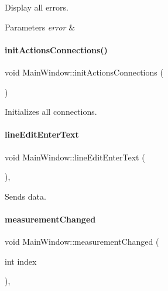 Display all errors. 


\begin{DoxyParams}{Parameters}
{\em error} & \\
\hline
\end{DoxyParams}
\mbox{\label{classMainWindow_a5235529d74723de1e3686da400dd1d37}} 
\paragraph{\texorpdfstring{init\+Actions\+Connections()}{initActionsConnections()}}
{\footnotesize\ttfamily void Main\+Window\+::init\+Actions\+Connections (\begin{DoxyParamCaption}{ }\end{DoxyParamCaption})\hspace{0.3cm}{\ttfamily [private]}}



Initializes all connections. 

\mbox{\label{classMainWindow_ad7ece63fdbb09608a22fc0631143b6ec}} 
\paragraph{\texorpdfstring{line\+Edit\+Enter\+Text}{lineEditEnterText}}
{\footnotesize\ttfamily void Main\+Window\+::line\+Edit\+Enter\+Text (\begin{DoxyParamCaption}{ }\end{DoxyParamCaption})\hspace{0.3cm}{\ttfamily [private]}, {\ttfamily [slot]}}



Sends data. 

\mbox{\label{classMainWindow_ad3fa656a0c81fa2ec687b02bd0f9658b}} 
\paragraph{\texorpdfstring{measurement\+Changed}{measurementChanged}}
{\footnotesize\ttfamily void Main\+Window\+::measurement\+Changed (\begin{DoxyParamCaption}\item[{int}]{index }\end{DoxyParamCaption})\hspace{0.3cm}{\ttfamily [private]}, {\ttfamily [slot]}}



